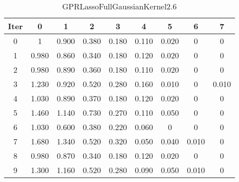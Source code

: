 \begin{table}
	\begin{center}
		\begin{tabular}{|c|c|c|c|c|c|c|c|c|}
			\hline
			Iter & 0 & 1 & 2 & 3 & 4 & 5 & 6 & 7 \\
			\hline
			0 & 1 & 0.900 & 0.380 & 0.180 & 0.110 & 0.020 & 0 & 0 \\
			\hline
			1 & 0.980 & 0.860 & 0.340 & 0.180 & 0.120 & 0.020 & 0 & 0 \\
			\hline
			2 & 0.980 & 0.890 & 0.360 & 0.180 & 0.110 & 0.020 & 0 & 0 \\
			\hline
			3 & 1.230 & 0.920 & 0.520 & 0.280 & 0.160 & 0.010 & 0 & 0.010 \\
			\hline
			4 & 1.030 & 0.890 & 0.370 & 0.180 & 0.120 & 0.020 & 0 & 0 \\
			\hline
			5 & 1.460 & 1.140 & 0.730 & 0.270 & 0.110 & 0.050 & 0 & 0 \\
			\hline
			6 & 1.030 & 0.600 & 0.380 & 0.220 & 0.060 & 0 & 0 & 0 \\
			\hline
			7 & 1.680 & 1.340 & 0.520 & 0.320 & 0.050 & 0.040 & 0.010 & 0 \\
			\hline
			8 & 0.980 & 0.870 & 0.340 & 0.180 & 0.120 & 0.020 & 0 & 0 \\
			\hline
			9 & 1.300 & 1.160 & 0.520 & 0.280 & 0.090 & 0.050 & 0.010 & 0 \\
			\hline
		\end{tabular}
	\end{center}
	\caption{GPRLassoFullGaussianKernel2.6}
\end{table}